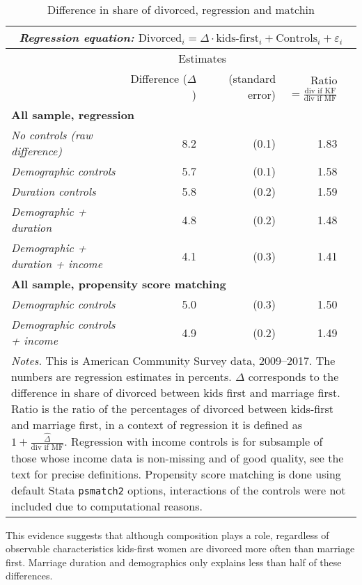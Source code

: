 \documentclass[12pt,letter]{article}
\begin{document}
\begin{table}[h]
\caption{Difference in share of divorced, regression and matchin\label{share_table_1}}
\begin{tabular}{l r r r r }
\multicolumn{5}{c}{\textit{Regression equation:} $\text{Divorced}_i = \Delta \cdot \text{kids-first}_i + \text{Controls}_i + \varepsilon_i$} \\\hline
\hline
& \multicolumn{2}{c}{Estimates} &  & \\
&  Difference ($\Delta$)  & (standard error) & Ratio $= \frac{\text{div if KF}}{\text{div if MF}}$ &  \\\hline
\multicolumn{5}{l}{\textbf{All sample, regression}} \\\hline
\textit{No controls (raw difference) }& 8.2 & (0.1) & 1.83 \\
\textit{Demographic controls }& 5.7 & (0.1) & 1.58 \\
\textit{Duration controls} &  5.8 & (0.2) & 1.59 \\
\textit{Demographic + duration} &  4.8 & (0.2) & 1.48 \\
\textit{Demographic + duration + income} & 4.1 & (0.3) & 1.41 \\\hline
\multicolumn{5}{l}{\textbf{All sample, propensity score matching}} \\\hline
\textit{Demographic controls} & 5.0 & (0.3) & 1.50 \\
\textit{Demographic controls + income} & 4.9 & (0.2) & 1.49 \\\hline
\multicolumn{5}{p{\linewidth}}{\footnotesize \textit{Notes.} This is American Community Survey data, 2009--2017. The numbers are regression estimates in percents.  $\Delta$ corresponds to the difference in share of divorced between kids first and marriage first. Ratio is the ratio of the percentages of divorced between kids-first and marriage first, in a context of regression it is defined as $1 + \frac{\hat{\Delta}}{\text{div if MF}}$. Regression with income controls is for subsample of those whose income data is non-missing and of good quality, see the text for precise definitions. Propensity score matching is done using default Stata \texttt{psmatch2} options, interactions of the controls were not included due to computational reasons.}\\\hline\hline
\end{tabular}
\end{table}

This evidence suggests that although composition plays a role, regardless of observable characteristics kids-first women are divorced more often than marriage first. Marriage duration and demographics only explains less than half of these differences. 
\end{document}
